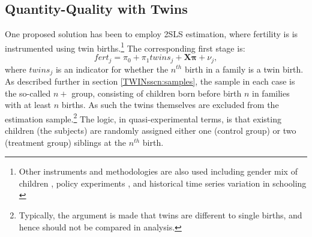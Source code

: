 \documentclass[subeqn]{article}
\begin{document}
\begin{spacing}{1.4}
\subsection{Quantity-Quality with Twins}           \label{TWINsscn:methodQQ}
One proposed solution has been to employ 2SLS estimation, where fertility is 
is instrumented using twin births.\footnote{Other instruments and methodologies 
are also used including gender mix of children \citep{ConleyGlauber2006}, policy 
experiments \citep{Qian2009}, and historical time series variation in schooling 
\citep{BleakleyLange2009}}  The corresponding first stage is:
\begin{equation}
\label{TWINeqn:firststage}
fert_{j}=\pi_0+\pi_1 twins_{j}+\bm{X}\bm{\pi}+\nu_{j},
\end{equation}
where $twins_j$ is an indicator for whether the $n^{th}$ birth in a family is a 
twin birth. As described further in section \ref{TWINsscn:samples}, the sample 
in each case is the so-called $n+$ group, consisting of children born before 
birth $n$ in families with at least $n$ births. As such the twins themselves are 
excluded from the estimation sample.\footnote{Typically, the argument is made 
that twins are different to single births, and hence should not be compared in 
analysis.} The logic, in quasi-experimental terms, is that existing children 
(the subjects) are randomly assigned either one (control group) or two 
(treatment group) siblings at the $n^{th}$ birth.


\end{spacing}
\end{document}
